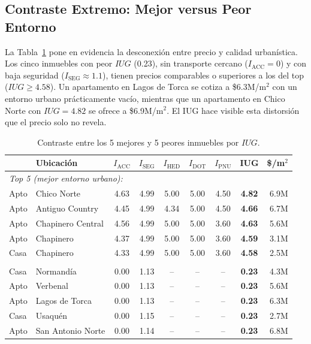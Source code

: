\documentclass[12pt, a4paper, twoside, openright]{report}
\theoremstyle{plain}
\theoremstyle{definition}
\newcommand{\IHED}{I_{\text{HED}}} %
\newcommand{\IACC}{I_{\text{ACC}}} %
\newcommand{\ISEG}{I_{\text{SEG}}} %
\newcommand{\IDOT}{I_{\text{DOT}}} %
\newcommand{\IPNU}{I_{\text{PNU}}} %
\newcommand{\IUG}{IUG}             %
\begin{document}
\subsection{Contraste Extremo: Mejor versus Peor Entorno}

La Tabla~\ref{tab:contraste_res} pone en evidencia la desconexión entre precio y calidad urbanística. Los cinco inmuebles con peor $\IUG$ (0.23), sin transporte cercano ($\IACC = 0$) y con baja seguridad ($\ISEG \approx 1.1$), tienen precios comparables o superiores a los del top ($\IUG \geq 4.58$). Un apartamento en Lagos de Torca se cotiza a \$6.3M/m$^2$ con un entorno urbano prácticamente vacío, mientras que un apartamento en Chico Norte con $\IUG = 4.82$ se ofrece a \$6.9M/m$^2$. El IUG hace visible esta distorsión que el precio solo no revela.

\begin{table}[htbp]
\centering
\caption{Contraste entre los 5 mejores y 5 peores inmuebles por $\IUG$.}
\label{tab:contraste_res}
\small
\begin{tabular}{@{}llccccccr@{}}
\toprule
& \textbf{Ubicación} & $\IACC$ & $\ISEG$ & $\IHED$ &
$\IDOT$ & $\IPNU$ & $\boldsymbol{\IUG}$ & \textbf{\$/m$^2$} \\
\midrule
\multicolumn{9}{l}{\textit{Top 5 (mejor entorno urbano):}} \\
Apto & Chico Norte & 4.63 & 4.99 & 5.00 & 5.00 & 4.50 & \textbf{4.82} & 6.9M \\
Apto & Antiguo Country & 4.45 & 4.99 & 4.34 & 5.00 & 4.50 & \textbf{4.66} & 6.7M \\
Apto & Chapinero Central & 4.56 & 4.99 & 5.00 & 5.00 & 3.60 & \textbf{4.63} & 5.6M \\
Apto & Chapinero & 4.37 & 4.99 & 5.00 & 5.00 & 3.60 & \textbf{4.59} & 3.1M \\
Casa & Chapinero & 4.33 & 4.99 & 5.00 & 5.00 & 3.60 & \textbf{4.58} & 2.5M \\
\addlinespace
\multicolumn{9}{l}{\textit{Bottom 5 (peor entorno urbano):}} \\
Casa & Normandía & 0.00 & 1.13 & -- & -- & -- & \textbf{0.23} & 4.3M \\
Apto & Verbenal & 0.00 & 1.13 & -- & -- & -- & \textbf{0.23} & 5.6M \\
Apto & Lagos de Torca & 0.00 & 1.13 & -- & -- & -- & \textbf{0.23} & 6.3M \\
Casa & Usaquén & 0.00 & 1.15 & -- & -- & -- & \textbf{0.23} & 2.7M \\
Apto & San Antonio Norte & 0.00 & 1.14 & -- & -- & -- & \textbf{0.23} & 6.8M \\
\bottomrule
\end{tabular}
\end{table}
\end{document}
